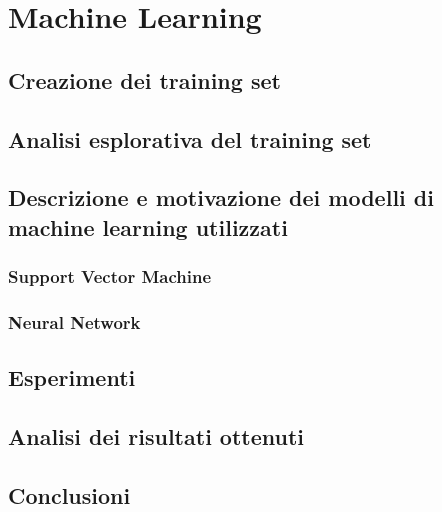 \setcounter{chapter}{0}
\part{Machine Learning}
\chapter{Creazione dei training set}

\chapter{Analisi esplorativa del training set}

\chapter{Descrizione e motivazione dei modelli di machine learning utilizzati}


\section{Support Vector Machine}

\section{Neural Network}

\chapter{Esperimenti}

\chapter{Analisi dei risultati ottenuti}

\chapter{Conclusioni}
